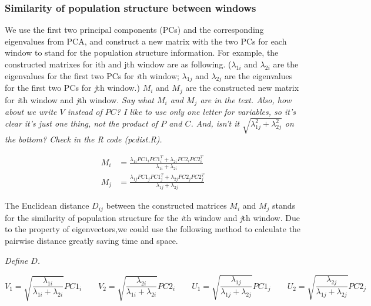 \documentclass[11pt, oneside]{article}   	%
\newcommand{\plr}[1]{{\em \color{blue} #1}}
\begin{document}
\subsubsection{Similarity of population structure between windows}
We use the first two principal components (PCs) and the corresponding eigenvalues from PCA, and construct a new matrix with the two PCs for each window to stand for the population structure information. 
For example, the constructed matrixes for ith and jth window are as following. 
($\lambda _{1i}$ and $\lambda _{2i}$ are the eigenvalues for the first two PCs for \textit{i}th window; $\lambda _{1j}$ and $\lambda _{2j}$ are the eigenvalues for the first two PCs for \textit{j}th window.) $M_i$ and $M_j$ are the constructed new matrix for \textit{i}th window and \textit{j}th window.
\plr{
Say what $M_i$ and $M_j$ are in the text.  
Also, how about we write $V$ instead of $PC$?  I like to use only one letter for variables, so it's clear it's just one thing, not the product of $P$ and $C$.
And, isn't it $\sqrt{\lambda_{1j}^2+\lambda_{2j}^2}$ on the bottom? Check in the R code (pc{\textunderscore}dist.R).
}

\begin{align}
    M_{i} &= \frac{\lambda_{1i}PC1_{i}PC1_{i}^{T}+\lambda_{2i}PC2_{i}PC2_{i}^{T}}{\lambda_{1i}+\lambda_{2i}} \\
    M_{j} &= \frac{\lambda_{1j}PC1_{j}PC1_{j}^{T}+\lambda_{2j}PC2_{j}PC2_{j}^{T}}{\lambda_{1j}+\lambda_{2j}}
\end{align}

The Euclidean distance $D_{ij}$ between the constructed matrices $M_i$ and $M_j$ stands for the similarity of population structure for the \textit{i}th window and \textit{j}th window. 
Due to the property of eigenvectors,we could use the following method to calculate the pairwise distance greatly saving time and space.

\plr{Define $D$.}

\begin{equation}
V_{1}=\sqrt{\frac{\lambda _{1i}}{\lambda _{1i}+\lambda _{2i}}}PC1_{i} \qquad
V_{2}=\sqrt{\frac{\lambda _{2i}}{\lambda _{1i}+\lambda _{2i}}}PC2_{i} \qquad
U_{1}=\sqrt{\frac{\lambda _{1j}}{\lambda _{1j}+\lambda _{2j}}}PC1_{j} \qquad
U_{2}=\sqrt{\frac{\lambda _{2j}}{\lambda _{1j}+\lambda _{2j}}}PC2_{j}
\end{equation}
\end{document}
